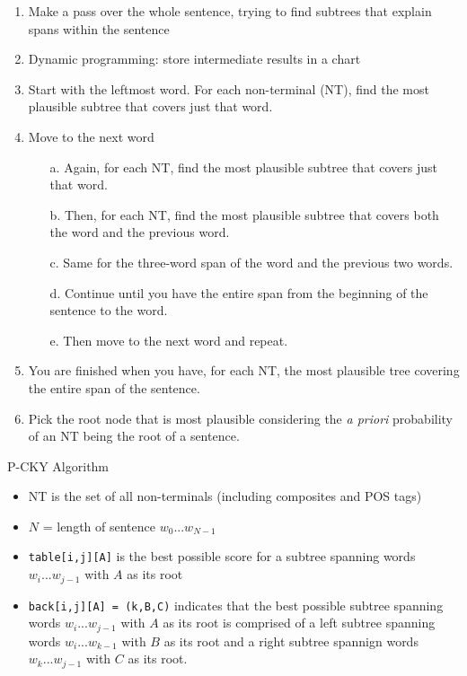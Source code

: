 \documentclass[11pt,letterpaper]{article}
\begin{document}
\begin{enumerate}
  \item Make a pass over the whole sentence, trying to find subtrees that explain spans within the sentence
  \item Dynamic programming: store intermediate results in a chart
  \item Start with the leftmost word.  For each non-terminal (NT), find the most plausible subtree that covers just that word.
  \item Move to the next word
    \begin{enumerate}
	  \item[a.] Again, for each NT, find the most plausible subtree that covers just that word.
	  \item[b.] Then, for each NT, find the most plausible subtree that covers both the word and the previous word.
	  \item[c.] Same for the three-word span of the word and the previous two words.
	  \item[d.] Continue until you have the entire span from the beginning of the sentence to the word.
	  \item[e.] Then move to the next word and repeat.
    \end{enumerate}
  \item You are finished when you have, for each NT, the most plausible tree covering the entire span of the sentence.
  \item Pick the root node that is most plausible considering the \textit{a priori} probability of an NT being the root of a sentence.
\end{enumerate}



P-CKY Algorithm


\begin{itemize}
  \item NT is the set of all non-terminals (including composites and POS tags)
  \item $N$ = length of sentence $w_0...w_{N-1}$
  \item \texttt{table[i,j][A]} is the best possible score for a subtree spanning words $w_i...w_{j-1}$ with $A$ as its root
  \item \texttt{back[i,j][A] = (k,B,C)} indicates that the best possible subtree spanning words $w_i...w_{j-1}$ with $A$ as its root is comprised of a left subtree spanning words $w_i...w_{k-1}$ with $B$ as its root and a right subtree spannign words $w_k...w_{j-1}$ with $C$ as its root.
\end{itemize}
\end{document}
